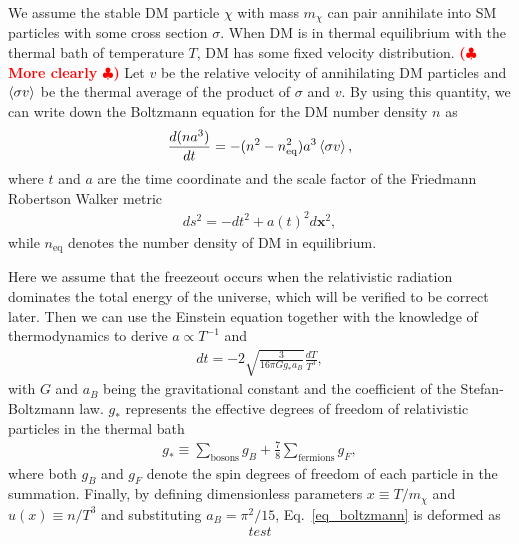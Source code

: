 \documentclass[12pt,twoside,book]{article}
\def\rem#1{ {\bf\textcolor{red}{($\clubsuit$ #1 $\clubsuit$)}}}
\begin{document}
We assume the stable DM particle $\chi$ with mass $m_\chi$ can pair
annihilate into SM particles with some cross section $\sigma$.  When
DM is in thermal equilibrium with the thermal bath of temperature $T$,
DM has some fixed velocity distribution.  \rem{More clearly}  Let $v$
be the relative velocity of annihilating DM particles and
$\Braket{\sigma v}$ be the thermal average of the product of $\sigma$
and $v$.  By using this quantity, we can write down the Boltzmann
equation for the DM number density $n$ as
\begin{align}
 \frac{d (n a^3)}{d t} =
 - (n^2 - n_{\mathrm{eq}}^2) a^3 \Braket{\sigma v},\label{eq_boltzmann}
\end{align}
where $t$ and $a$ are the time coordinate and the scale factor of the
Friedmann Robertson Walker metric
\begin{align}
 d s^2 = - d t^2 + a(t)^2 d \bm{x}^2,
\end{align}
while $n_{\mathrm{eq}}$ denotes the number density of DM in
equilibrium.

Here we assume that the freezeout occurs when the relativistic
radiation dominates the total energy of the universe, which will be
verified to be correct later.  Then we can use the Einstein equation
together with the knowledge of thermodynamics to derive $a \propto
T^{-1}$ and
\begin{align}
 d t = -2 \sqrt{\frac
 {3}{16\pi G g_{*} a_B}} \frac{d T}{T^3},
\end{align}
with $G$ and $a_B$ being the gravitational constant and the
coefficient of the Stefan-Boltzmann law.  $g_{*}$ represents the
effective degrees of freedom of relativistic particles in the thermal
bath
\begin{align}
 g_{*} \equiv \sum_{\mathrm{bosons}} g_B +
 \frac{7}{8} \sum_{\mathrm{fermions}} g_F,
\end{align}
where both $g_B$ and $g_F$ denote the spin degrees of freedom of each
particle in the summation.  Finally, by defining dimensionless
parameters $x \equiv T / m_\chi$ and $u(x) \equiv n / T^3$ and
substituting $a_B = \pi^2 / 15$, Eq.~\ref{eq_boltzmann} is deformed as
\begin{align}
 test
\end{align}

\begin{appendices}
 
\end{appendices}

\clearpage



\end{document}
